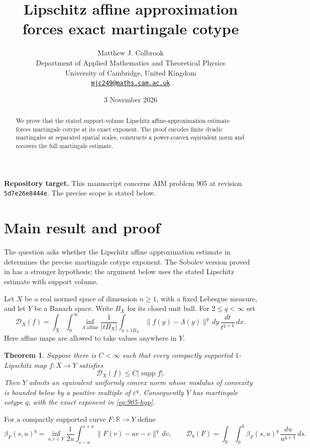 \documentclass[11pt,a4paper]{article}
\title{\textbf{Lipschitz affine approximation forces exact martingale cotype}}
\author{Matthew J. Colbrook\\[3pt]
{\small Department of Applied Mathematics and Theoretical Physics}\\
{\small University of Cambridge, United Kingdom}\\
{\small\href{mailto:mjc249@maths.cam.ac.uk}{\texttt{mjc249@maths.cam.ac.uk}}}}
\date{3 November 2026}
\newtheorem{theorem}{Theorem}[section]
\theoremstyle{remark}
\begin{document}
\maketitle
\begin{abstract}
We prove that the stated support-volume Lipschitz affine-approximation estimate forces martingale cotype at its exact exponent. The proof encodes finite dyadic martingales at separated spatial scales, constructs a power-convex equivalent norm and recovers the full martingale estimate.
\end{abstract}
\noindent\textbf{Repository target.}
This manuscript concerns AIM problem 905 at revision
\texttt{5d7e26e8444e}. The precise scope is stated below.
\medskip

\section{Main result and proof}
\label{sec:905}

The question asks whether the Lipschitz affine approximation estimate in
\cite[Question~10]{HN2019} determines the precise martingale cotype exponent.
The Sobolev version proved in \cite{HM2019} has a stronger hypothesis;
the argument below uses the stated Lipschitz estimate with support volume.

Let $X$ be a real normed space of dimension $n\geq1$, with a fixed Lebesgue
measure, and let $Y$ be a Banach space.  Write $B_X$ for its closed unit ball.
For $2\leq q<\infty$ set
\[
 \mathcal D_X(f)=\int_X\int_0^\infty
 \inf_{\Lambda\text{ affine}}
 \frac{1}{|tB_X|}\int_{x+tB_X}\|f(y)-\Lambda(y)\|^q\,dy\,
 \frac{dt}{t^{q+1}}\,dx.
\]
Here affine maps are allowed to take values anywhere in $Y$.

\begin{theorem}\label{thm:905}
Suppose there is $C<\infty$ such that every compactly supported
$1$-Lipschitz map $f:X\to Y$ satisfies
\begin{equation}\label{eq:905-hyp}
 \mathcal D_X(f)\leq C|\operatorname{supp} f|.
\end{equation}
Then $Y$ admits an equivalent uniformly convex norm whose modulus of
convexity is bounded below by a positive multiple of $\varepsilon^q$.
Consequently $Y$ has martingale cotype $q$, with the exact exponent in
\eqref{eq:905-hyp}.
\end{theorem}

For a compactly supported curve $F:\mathbb R\to Y$ define
\[
 \beta_F(s,u)^q=\inf_{a,c\in Y}\frac1{2u}
 \int_{s-u}^{s+u}\|F(v)-av-c\|^q\,dv,
 \qquad
 \mathcal D_b(F)=\int_{\mathbb R}\int_0^b
 \beta_F(s,u)^q\,\frac{du}{u^{q+1}}\,ds.
\]
\end{document}

